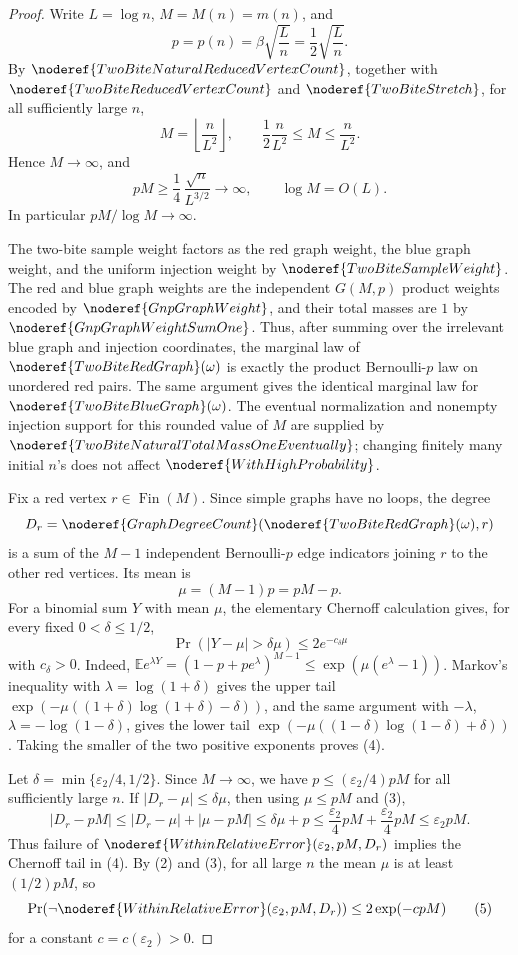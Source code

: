 \begin{proof}
Write \(L=\log n\), \(M=M(n)=m(n)\), and
\[
p=p(n)=\beta\sqrt{\frac{L}{n}}=\frac12\sqrt{\frac{L}{n}}.
\]
By \(\noderef{TwoBiteNaturalReducedVertexCount}\), together with
\(\noderef{TwoBiteReducedVertexCount}\) and \(\noderef{TwoBiteStretch}\), for
all sufficiently large \(n\),
\[
M=\left\lfloor\frac{n}{L^2}\right\rfloor,\qquad
\frac12\frac{n}{L^2}\le M\le \frac{n}{L^2}.
\tag{1}
\]
Hence \(M\to\infty\), and
\[
pM \ge \frac14\,\frac{\sqrt n}{L^{3/2}}\longrightarrow\infty,
\qquad
\log M=O(L).
\tag{2}
\]
In particular \(pM/\log M\to\infty\).

The two-bite sample weight factors as the red graph weight, the blue graph
weight, and the uniform injection weight by \(\noderef{TwoBiteSampleWeight}\).
The red and blue graph weights are the independent \(G(M,p)\) product
weights encoded by \(\noderef{GnpGraphWeight}\), and their total masses are
\(1\) by \(\noderef{GnpGraphWeightSumOne}\).  Thus, after summing over the
irrelevant blue graph and injection coordinates, the marginal law of
\(\noderef{TwoBiteRedGraph}(\omega)\) is exactly the product Bernoulli-\(p\)
law on unordered red pairs.  The same argument gives the identical marginal
law for \(\noderef{TwoBiteBlueGraph}(\omega)\).  The eventual normalization
and nonempty injection support for this rounded value of \(M\) are supplied
by \(\noderef{TwoBiteNaturalTotalMassOneEventually}\); changing finitely many
initial \(n\)'s does not affect \(\noderef{WithHighProbability}\).

Fix a red vertex \(r\in\operatorname{Fin}(M)\).  Since simple graphs have no
loops, the degree
\[
D_r=\noderef{GraphDegreeCount}(\noderef{TwoBiteRedGraph}(\omega),r)
\]
is a sum of the \(M-1\) independent Bernoulli-\(p\) edge indicators joining
\(r\) to the other red vertices.  Its mean is
\[
\mu=(M-1)p=pM-p.
\tag{3}
\]
For a binomial sum \(Y\) with mean \(\mu\), the elementary Chernoff
calculation gives, for every fixed \(0<\delta\le 1/2\),
\[
\Pr(|Y-\mu|>\delta\mu)\le 2e^{-c_\delta\mu}
\tag{4}
\]
with \(c_\delta>0\).  Indeed,
\(\mathbb E e^{\lambda Y}=(1-p+pe^\lambda)^{M-1}
\le \exp(\mu(e^\lambda-1))\).  Markov's inequality with
\(\lambda=\log(1+\delta)\) gives the upper tail
\(\exp(-\mu((1+\delta)\log(1+\delta)-\delta))\), and the same argument with
\(-\lambda\), \(\lambda=-\log(1-\delta)\), gives the lower tail
\(\exp(-\mu((1-\delta)\log(1-\delta)+\delta))\).  Taking the smaller of the
two positive exponents proves (4).

Let \(\delta=\min\{\varepsilon_2/4,1/2\}\).  Since \(M\to\infty\), we have
\(p\le(\varepsilon_2/4)pM\) for all sufficiently large \(n\).  If
\(|D_r-\mu|\le\delta\mu\), then using \(\mu\le pM\) and (3),
\[
|D_r-pM|
\le |D_r-\mu|+|\mu-pM|
\le \delta\mu+p
\le \frac{\varepsilon_2}{4}pM+\frac{\varepsilon_2}{4}pM
\le \varepsilon_2 pM.
\]
Thus failure of
\(\noderef{WithinRelativeError}(\varepsilon_2,pM,D_r)\) implies the
Chernoff tail in (4).  By (2) and (3), for all large \(n\) the mean \(\mu\)
is at least \((1/2)pM\), so
\[
\Pr\!\left(
\neg\noderef{WithinRelativeError}(\varepsilon_2,pM,D_r)
\right)
\le 2\exp(-c pM)
\tag{5}
\]
for a constant \(c=c(\varepsilon_2)>0\).


\end{proof}
